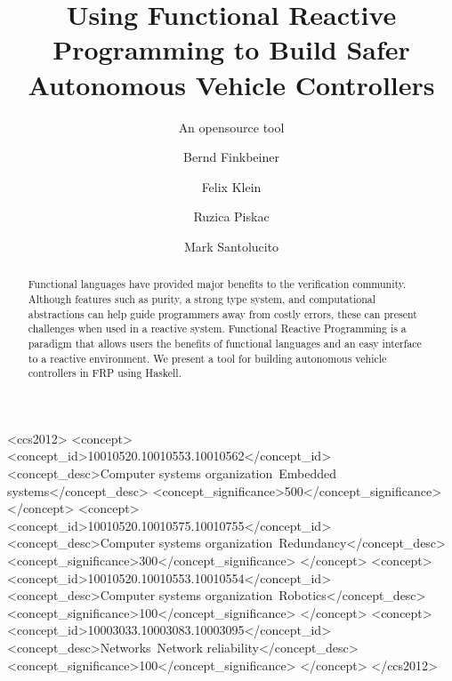 \documentclass[sigconf]{acmart}
\begin{document}
\title{Using Functional Reactive Programming to Build Safer Autonomous Vehicle Controllers}
\subtitle{An opensource tool}

\author{Bernd Finkbeiner}

\author{Felix Klein}

\author{Ruzica Piskac}

\author{Mark Santolucito}

\begin{abstract}
Functional languages have provided major benefits to the verification community.
Although features such as purity, a strong type system, and computational abstractions can help guide programmers away from costly errors, these can present challenges when used in a reactive system.
Functional Reactive Programming is a paradigm that allows users the benefits of functional languages and an easy interface to a reactive environment.
We present a tool for building autonomous vehicle controllers in FRP using Haskell.
\end{abstract}

%
%
\begin{CCSXML}
<ccs2012>
 <concept>
  <concept_id>10010520.10010553.10010562</concept_id>
  <concept_desc>Computer systems organization~Embedded systems</concept_desc>
  <concept_significance>500</concept_significance>
 </concept>
 <concept>
  <concept_id>10010520.10010575.10010755</concept_id>
  <concept_desc>Computer systems organization~Redundancy</concept_desc>
  <concept_significance>300</concept_significance>
 </concept>
 <concept>
  <concept_id>10010520.10010553.10010554</concept_id>
  <concept_desc>Computer systems organization~Robotics</concept_desc>
  <concept_significance>100</concept_significance>
 </concept>
 <concept>
  <concept_id>10003033.10003083.10003095</concept_id>
  <concept_desc>Networks~Network reliability</concept_desc>
  <concept_significance>100</concept_significance>
 </concept>
</ccs2012>  
\end{CCSXML}
\end{document}
